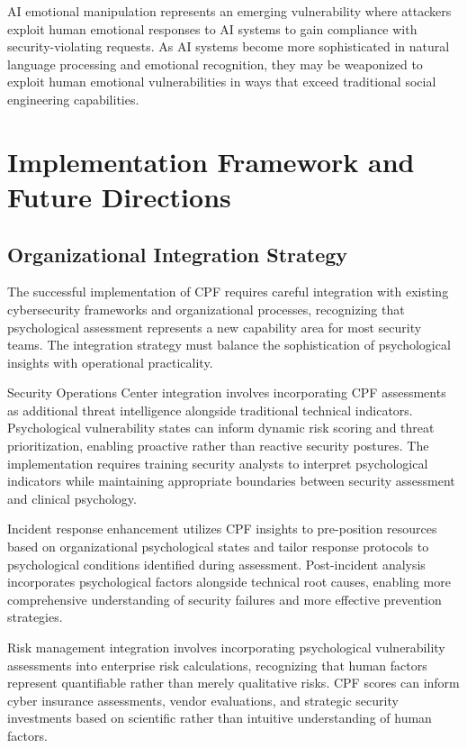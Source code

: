 \documentclass[11pt,a4paper]{article}
\begin{document}
AI emotional manipulation represents an emerging vulnerability where attackers exploit human emotional responses to AI systems to gain compliance with security-violating requests. As AI systems become more sophisticated in natural language processing and emotional recognition, they may be weaponized to exploit human emotional vulnerabilities in ways that exceed traditional social engineering capabilities.

\section{Implementation Framework and Future Directions}

\subsection{Organizational Integration Strategy}

The successful implementation of CPF requires careful integration with existing cybersecurity frameworks and organizational processes, recognizing that psychological assessment represents a new capability area for most security teams. The integration strategy must balance the sophistication of psychological insights with operational practicality.

Security Operations Center integration involves incorporating CPF assessments as additional threat intelligence alongside traditional technical indicators. Psychological vulnerability states can inform dynamic risk scoring and threat prioritization, enabling proactive rather than reactive security postures. The implementation requires training security analysts to interpret psychological indicators while maintaining appropriate boundaries between security assessment and clinical psychology.

Incident response enhancement utilizes CPF insights to pre-position resources based on organizational psychological states and tailor response protocols to psychological conditions identified during assessment. Post-incident analysis incorporates psychological factors alongside technical root causes, enabling more comprehensive understanding of security failures and more effective prevention strategies.

Risk management integration involves incorporating psychological vulnerability assessments into enterprise risk calculations, recognizing that human factors represent quantifiable rather than merely qualitative risks. CPF scores can inform cyber insurance assessments, vendor evaluations, and strategic security investments based on scientific rather than intuitive understanding of human factors.
\end{document}
